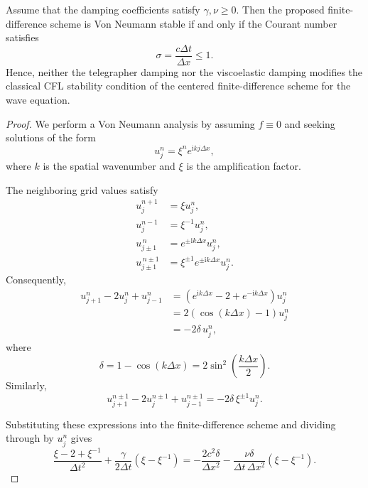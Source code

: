 \documentclass{Configuration_Files/PoliMi3i_thesis}
\begin{document}
\begin{proposition}
Assume that the damping coefficients satisfy $\gamma,\nu\ge0$. Then the
proposed finite-difference scheme is Von Neumann stable if and only if the
Courant number satisfies
\begin{equation*}
    \sigma=\frac{c\Delta t}{\Delta x}\le1.
\end{equation*}
Hence, neither the telegrapher damping nor the viscoelastic damping modifies
the classical CFL stability condition of the centered finite-difference scheme
for the wave equation.
\end{proposition}

\begin{proof}
We perform a Von Neumann analysis by assuming $f\equiv0$ and seeking solutions
of the form
\begin{equation*}
    u_j^n=\xi^n e^{\mathrm{i}kj\Delta x},
\end{equation*}
where $k$ is the spatial wavenumber and $\xi$ is the amplification factor.

The neighboring grid values satisfy
\begin{align*}
u_j^{n+1}&=\xi u_j^n,\\
u_j^{n-1}&=\xi^{-1}u_j^n,\\
u_{j\pm1}^{\,n}&=e^{\pm\mathrm{i}k\Delta x}u_j^n,\\
u_{j\pm1}^{\,n\pm1}&=\xi^{\pm1}e^{\pm\mathrm{i}k\Delta x}u_j^n.
\end{align*}
Consequently,
\begin{align*}
u_{j+1}^n-2u_j^n+u_{j-1}^n
&=
\left(e^{\mathrm{i}k\Delta x}-2+e^{-\mathrm{i}k\Delta x}\right)u_j^n\\
&=
2(\cos(k\Delta x)-1)u_j^n\\
&=
-2\delta\,u_j^n,
\end{align*}
where
\begin{equation*}
\delta
=
1-\cos(k\Delta x)
=
2\sin^2\!\left(\frac{k\Delta x}{2}\right).
\end{equation*}
Similarly,
\begin{equation*}
u_{j+1}^{n\pm1}
-2u_j^{n\pm1}
+u_{j-1}^{n\pm1}
=
-2\delta\,\xi^{\pm1}u_j^n.
\end{equation*}

Substituting these expressions into the finite-difference scheme and dividing
through by $u_j^n$ gives
\begin{equation*}
\frac{\xi-2+\xi^{-1}}{\Delta t^2}
+
\frac{\gamma}{2\Delta t}\left(\xi-\xi^{-1}\right)
=
-\frac{2c^2\delta}{\Delta x^2}
-
\frac{\nu\delta}{\Delta t\,\Delta x^2}
\left(\xi-\xi^{-1}\right).
\end{equation*}


\end{proof}
\end{document}

